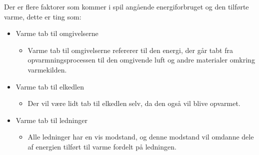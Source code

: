 Der er flere faktorer som kommer i spil angående energiforbruget og den tilførte varme, dette er ting som:
\begin{itemize}
    \item Varme tab til omgivelserne
    \begin{itemize}
        \item Varme tab til omgivelserne refererer til den energi, der går tabt fra opvarmningsprocessen til den omgivende luft og andre materialer omkring varmekilden.
    \end{itemize}
    \item Varme tab til elkedlen
    \begin{itemize}
        \item Der vil være lidt tab til elkedlen selv, da den også vil blive opvarmet.
    \end{itemize}
    \item Varme tab til ledninger
    \begin{itemize}
        \item Alle ledninger har en vis modstand, og denne modstand vil omdanne dele af energien tilført til varme fordelt på ledningen. 
    \end{itemize}
\end{itemize}


